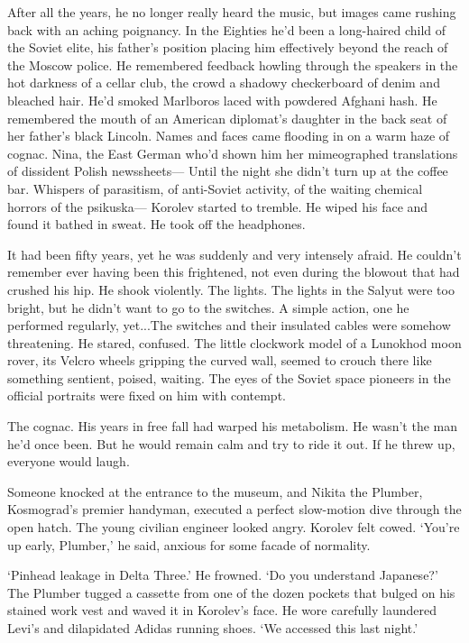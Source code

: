 After all the years, he no longer really heard the music, but images came rushing back with an aching poignancy. In the Eighties he'd been a long-haired child of the Soviet elite, his father's position placing him effectively beyond the reach of the Moscow police. He remembered feedback howling through the speakers in the hot darkness of a cellar club, the crowd a shadowy checkerboard of denim and bleached hair. He'd smoked Marlboros laced with powdered Afghani hash. He remembered the mouth of an American diplomat's daughter in the back seat of her father's black Lincoln. Names and faces came flooding in on a warm haze of cognac. Nina, the East German who'd shown him her mimeographed translations of dissident Polish newssheets--- Until the night she didn't turn up at the coffee bar. Whispers of parasitism, of anti-Soviet activity, of the waiting chemical horrors of the psikuska--- Korolev started to tremble. He wiped his face and found it bathed in sweat. He took off the headphones.

It had been fifty years, yet he was suddenly and very intensely afraid. He couldn't remember ever having been this frightened, not even during the blowout that had crushed his hip. He shook violently. The lights. The lights in the Salyut were too bright, but he didn't want to go to the switches. A simple action, one he performed regularly, yet...The switches and their insulated cables were somehow threatening. He stared, confused. The little clockwork model of a Lunokhod moon rover, its Velcro wheels gripping the curved wall, seemed to crouch there like something sentient, poised, waiting. The eyes of the Soviet space pioneers in the official portraits were fixed on him with contempt.

The cognac. His years in free fall had warped his metabolism. He wasn't the man he'd once been. But he would remain calm and try to ride it out. If he threw up, everyone would laugh.

Someone knocked at the entrance to the museum, and Nikita the Plumber, Kosmograd's premier handyman, executed a perfect slow-motion dive through the open hatch. The young civilian engineer looked angry. Korolev felt cowed. `You're up early, Plumber,' he said, anxious for some facade of normality.

`Pinhead leakage in Delta Three.' He frowned. `Do you understand Japanese?' The Plumber tugged a cassette from one of the dozen pockets that bulged on his stained work vest and waved it in Korolev's face. He wore carefully laundered Levi's and dilapidated Adidas running shoes. `We accessed this last night.'


